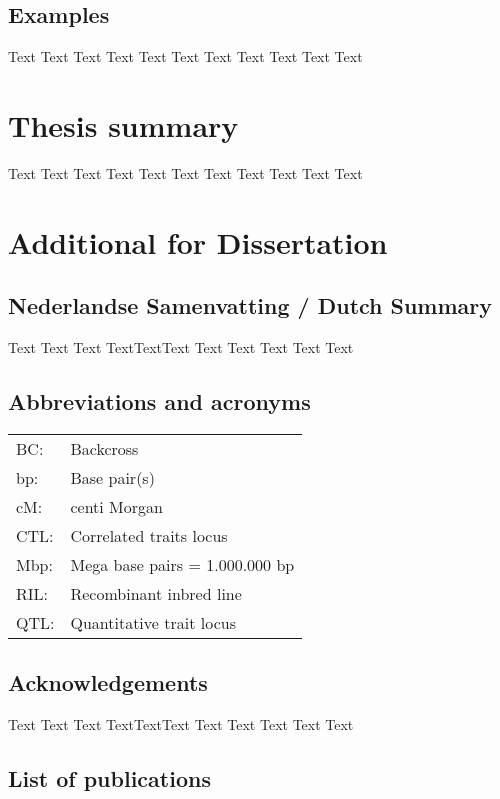 \documentclass[11pt, twoside, a5paper]{report}
\begin{document}
\section{Examples}
Text Text Text Text Text Text Text Text Text Text Text

\chapter{Thesis summary}
Text Text Text Text Text Text Text Text Text Text Text

\chapter{Additional for Dissertation}
\section*{Nederlandse Samenvatting / Dutch Summary}
Text Text Text TextTextText Text Text Text Text Text

\section*{Abbreviations and acronyms}
\begin{tabular}{ l l }
BC:          & Backcross \\
bp:          & Base pair(s) \\
cM:          & centi Morgan \\
CTL:         & Correlated traits locus \\
Mbp:         & Mega base pairs = 1.000.000 bp \\
RIL:         & Recombinant inbred line \\
QTL:         & Quantitative trait locus \\
\end{tabular}

\section*{Acknowledgements}
Text Text Text TextTextText Text Text Text Text Text

\section*{List of publications}
\end{document}
